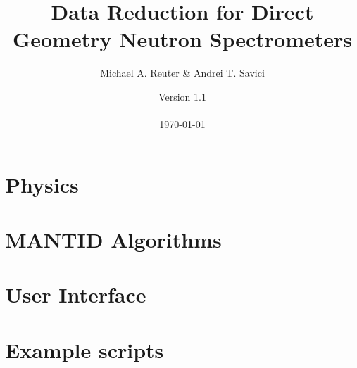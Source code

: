 \documentclass[11pt]{article}
\numberwithin{equation}{section}
\numberwithin{figure}{section}
\begin{document}
\title{Data Reduction for Direct Geometry Neutron Spectrometers}
\author{Michael A. Reuter \& Andrei T. Savici}
\date{Version 1.1 \\ \ \\ \today}
\maketitle

\section{Physics}\label{sec:Physics}

\section{MANTID Algorithms}\label{sec:Algs}

\section{User Interface}\label{sec:UI}

\section{Example scripts}\label{sec:Examples}

\end{document}
